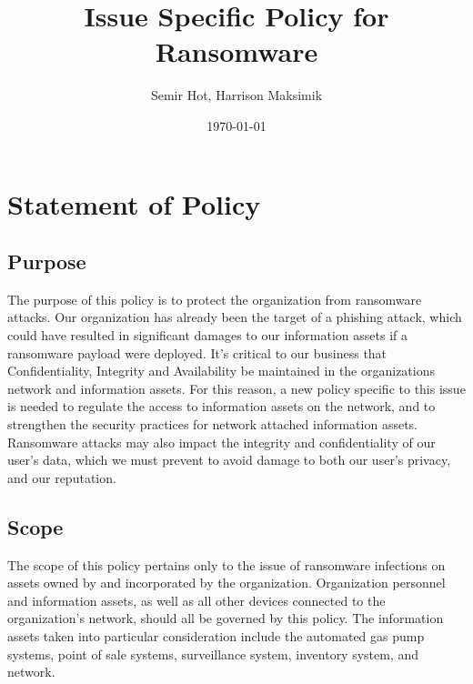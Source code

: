 \documentclass[11pt]{article}
\author{Semir Hot, Harrison Maksimik}
\date{\today}
\title{Issue Specific Policy for Ransomware}
\begin{document}
\maketitle
\tableofcontents

\section{Statement of Policy}
\label{sec:orgd4e02ed}
\subsection{Purpose}
\label{sec:org58dec4a}
The purpose of this policy is to protect the organization from ransomware attacks. Our organization has already been the target of a phishing attack, which could have resulted in significant damages to our information assets if a ransomware payload were deployed. It's critical to our business that Confidentiality, Integrity and Availability be maintained in the organizations network and information assets. For this reason, a new policy specific to this issue is needed to regulate the access to information assets on the network, and to strengthen the security practices for network attached information assets. Ransomware attacks may also impact the integrity and confidentiality of our user's data, which we must prevent to avoid damage to both our user's privacy, and our reputation.

\subsection{Scope}
\label{sec:orgdfae1bb}
The scope of this policy pertains only to the issue of ransomware infections on assets owned by and incorporated by the organization. Organization personnel and information assets, as well as all other devices connected to the organization's network, should all be governed by this policy. The information assets taken into particular consideration include the automated gas pump systems, point of sale systems, surveillance system, inventory system, and network.
\end{document}
